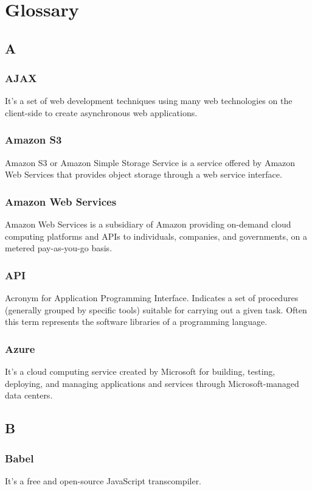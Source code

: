 \appendix
\section{Glossary}\label{_glossary}

\subsection*{A}
\subsubsection*{AJAX}
It's a set of web development techniques using many web technologies on the client-side to create asynchronous web applications.

\subsubsection*{Amazon S3}
Amazon S3 or Amazon Simple Storage Service is a service offered by Amazon Web Services that provides object storage through 
a web service interface.

\subsubsection*{Amazon Web Services}
Amazon Web Services is a subsidiary of Amazon providing on-demand cloud computing platforms 
and APIs to individuals, companies, and governments, on a metered pay-as-you-go basis.

\subsubsection*{API}
Acronym for Application Programming Interface. Indicates a set of procedures
(generally grouped by specific tools) suitable for carrying out a given task. Often this term
represents the software libraries of a programming language.

\subsubsection*{Azure}
It's a cloud computing service created by Microsoft for building, testing, deploying, and managing 
applications and services through Microsoft-managed data centers.

\subsection*{B}
\subsubsection*{Babel}
It's a free and open-source JavaScript transcompiler.

